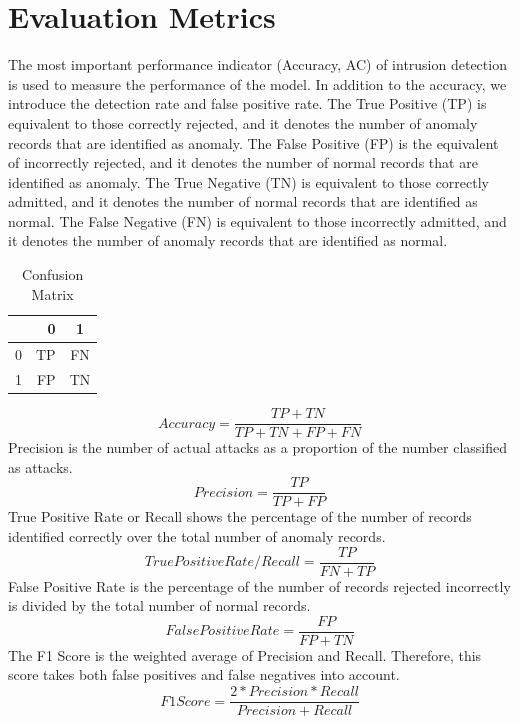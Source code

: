 \section{Evaluation Metrics}
\vspace{-18pt}
The most important performance indicator (Accuracy, AC) of intrusion detection is used to measure the performance of the model. In addition to the accuracy, we introduce the detection rate and false positive rate. The True Positive (TP) is equivalent to those correctly rejected, and it denotes the number of anomaly records that are identified as anomaly. The False Positive (FP) is the equivalent of incorrectly rejected, and it denotes the number of normal records that are identified as anomaly. The True Negative (TN) is equivalent to those correctly admitted, and it denotes the number of normal records that are identified as normal. The False Negative (FN) is equivalent to those incorrectly admitted, and it denotes the number of anomaly records that are identified as normal.
\begin{table}[tbh]
	\centering
	\begin{tabular}{|c|r|c|} %
		\hline %
		  &0 &1  \\
		\hline %
		0 &TP &FN  \\
		\hline %
		1 &FP &TN\\
		\hline
	\end{tabular}
	\caption{Confusion Matrix}
	\label{Confusion Matrix}
\end{table}
\begin{equation}
	Accuracy = \frac{TP + TN}{TP + TN + FP + FN}
\end{equation} 
Precision is the number of actual attacks as a proportion of the number classified as attacks.
\begin{equation}
	Precision = \frac{TP}{TP + FP} 
\end{equation}
True Positive Rate or Recall shows the percentage of the number of records identified correctly over the total number of anomaly records.
\begin{equation}
	True Positive Rate/ Recall = \frac{TP}{FN + TP}
\end{equation}
False Positive Rate is the percentage of the number of records rejected incorrectly is divided by the total number of normal records.
\begin{equation}
	False Positive Rate = \frac{FP}{FP + TN}
\end{equation}
The F1 Score is the weighted average of Precision and Recall. Therefore, this score takes both false positives and false negatives into account.
\begin{equation}
	F1 Score = \frac{2 * Precision * Recall}{Precision + Recall}
\end{equation}
